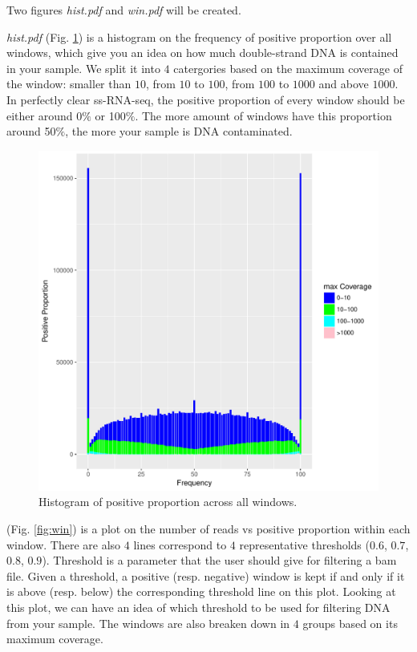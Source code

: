 \documentclass{article}\usepackage[]{graphicx}\usepackage[]{color}
\makeatletter
\def\maxwidth{ %
  \ifdim\Gin@nat@width>\linewidth
    \linewidth
  \else
    \Gin@nat@width
  \fi
}
\makeatother
\begin{document}
Two figures \textit{hist.pdf} and \textit{win.pdf} will be created.

\textit{hist.pdf} (Fig. \ref{fig:hist}) is a histogram on the frequency of positive proportion over all windows, which give you an idea on how much double-strand DNA is contained in your sample. We split it into $4$ catergories based on the maximum coverage of the window: smaller than $10$, from $10$ to $100$, from $100$ to $1000$ and above $1000$. In perfectly clear ss-RNA-seq, the positive proportion of every window should be either around 0$\%$ or 100$\%$. The more amount of windows have this proportion around 50$\%$, the more your sample is DNA contaminated.

\begin{figure}[H]
  \centering
  \includegraphics[width=\maxwidth]{hist.pdf}
  \caption{Histogram of positive proportion across all windows.}
  \label{fig:hist}
\end{figure}

 (Fig. \ref{fig:win}) is a plot on the number of reads vs positive proportion within each window. There are also $4$ lines correspond to $4$ representative thresholds ($0.6$, $0.7$, $0.8$, $0.9$). Threshold is a parameter that the user should give for filtering a bam file. 
Given a threshold, a positive (resp. negative) window is kept if and only if it is above (resp. below) the corresponding threshold line on this plot. Looking at this plot, we can have an idea of which threshold to be used for filtering DNA from your sample. The windows are also breaken down in $4$ groups based on its maximum coverage.
\end{document}

